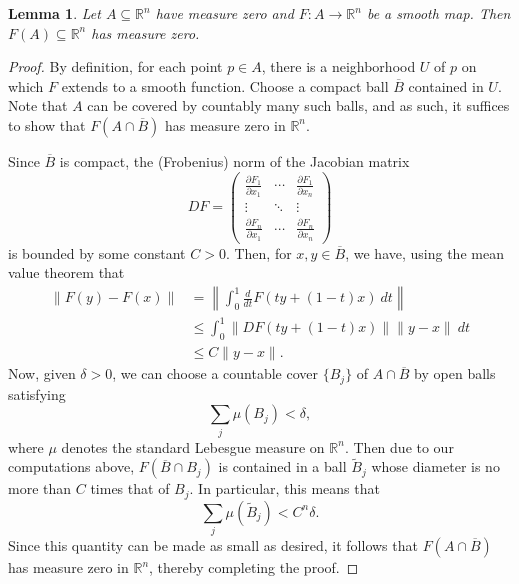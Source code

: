 \documentclass[11pt]{article}
\theoremstyle{thmstyle}
\newtheorem{lemma}[theorem]{Lemma}
\theoremstyle{defstyle}
\newcommand{\R}{\mathbb{R}}
\newcommand{\wt}[1]{\widetilde{#1}}
\renewcommand{\le}{\leqslant}
\begin{document}
\begin{lemma}
	Let $A\subseteq\R^n$ have measure zero and $F\colon A\to\R^n$ be a smooth map. Then $F(A)\subseteq\R^n$ has measure zero.
\end{lemma}
\begin{proof}
	By definition, for each point $p\in A$, there is a neighborhood $U$ of $p$ on which $F$ extends to a smooth function. Choose a compact ball $\overline B$ contained in $U$. Note that $A$ can be covered by countably many such balls, and as such, it suffices to show that $F(A\cap\overline B)$ has measure zero in $\R^n$.

	Since $\overline B$ is compact, the (Frobenius) norm of the Jacobian matrix 
	\begin{equation*}
		DF = 
		\begin{pmatrix}
			\frac{\partial F_1}{\partial x_1} & \cdots & \frac{\partial F_1}{\partial x_n}\\
			\vdots & \ddots & \vdots\\
			\frac{\partial F_n}{\partial x_1} & \cdots & \frac{\partial F_n}{\partial x_n}
		\end{pmatrix}
	\end{equation*}
	is bounded by some constant $C > 0$. Then, for $x, y\in\overline B$, we have, using the mean value theorem that 
	\begin{align*}
		\|F(y) - F(x)\| &= \left\|\int_{0}^1\frac{d}{dt}F(ty + (1 - t)x)~dt\right\|\\
		&\le\int_0^1\|DF\left(ty + (1 - t)x\right)\|\|y - x\|~dt\\
		&\le C\|y - x\|.
	\end{align*}
	Now, given $\delta > 0$, we can choose a countable cover $\{B_j\}$ of $A\cap\overline B$ by open balls satisfying 
	\begin{equation*}
		\sum_{j}\mu\left(B_j\right) < \delta,
	\end{equation*}
	where $\mu$ denotes the standard Lebesgue measure on $\R^n$. Then due to our computations above, $F(\overline{B}\cap B_j)$ is contained in a ball $\wt B_j$ whose diameter is no more than $C$ times that of $B_j$. In particular, this means that 
	\begin{equation*}
		\sum_{j}\mu\left(\wt B_j\right) < C^n\delta.
	\end{equation*}
	Since this quantity can be made as small as desired, it follows that $F(A\cap\overline B)$ has measure zero in $\R^n$, thereby completing the proof.
\end{proof}
\end{document}
